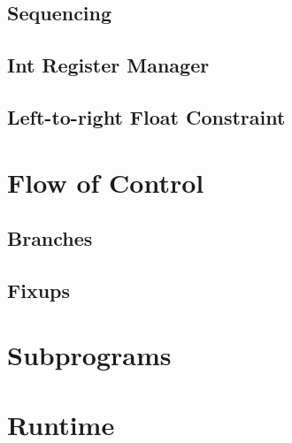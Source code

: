 \subsection{Sequencing}
\subsection{Int Register Manager}
\subsection{Left-to-right Float Constraint}

\section{Flow of Control}
\subsection{Branches}
\subsection{Fixups}

\section{Subprograms}

\section{Runtime}



